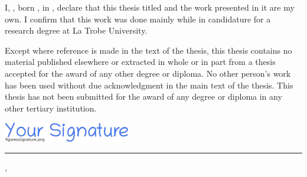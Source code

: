 
\noindent I, {\myFirstName} {\myLastName}, born {\myBirthMonth} {\myBirthDay}, {\myBirthYear} in {\myBirthPlace}, declare that this thesis titled \emph{\myTitle} and the work presented in it are my own. I confirm that this work was done mainly while in candidature for a research degree at La Trobe University.

Except where reference is made in the text of the thesis, this thesis contains no material published elsewhere or extracted in whole or in part from a thesis accepted for the award of any other degree or diploma. No other person's work has been used without due acknowledgment in the main text of the thesis. This thesis has not been submitted for the award of any degree or diploma in any other tertiary institution.

\vspace{5em}


\noindent\hspace{0.5em}\includegraphics[width=15em]{figures/signature}\\
\noindent\rule[1em]{16.5em}{0.5pt}

\vspace{-1.5em}
\noindent {\myFirstName} {\myLastName} \hspace{12em} {\mySubmissionMonth} {\mySubmissionDay}, {\mySubmissionYear}
